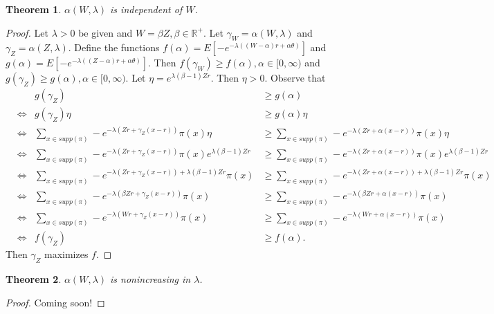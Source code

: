 \documentclass[12pt]{article}
\newtheorem{thm}{Theorem}[section]
\theoremstyle{definition}
\theoremstyle{remark}
\def\RR{\mathbb{R}}
\begin{document}
\begin{thm}
  $\alpha(W, \lambda)$ is independent of $W$.
\end{thm}
\begin{proof}
  Let $\lambda > 0$ be given and $W = \beta Z, \beta \in \RR^+$. Let $\gamma_W = \alpha(W, \lambda)$ and $\gamma_Z = \alpha(Z, \lambda)$. Define the functions $f(\alpha) = E \left[-e^{- \lambda ((W - \alpha)r + \alpha \theta)} \right]$ and $g(\alpha) = E \left[-e^{- \lambda ((Z - \alpha)r + \alpha \theta)} \right]$.
  Then $f(\gamma_W) \geq f(\alpha), \alpha \in [0, \infty )$ and $g(\gamma_Z) \geq g(\alpha), \alpha \in [0, \infty )$.
  Let $\eta = e^{\lambda (\beta - 1)Zr}$. Then $\eta > 0$. Observe that
  \begin{align*}
    &       & g(\gamma_Z) &\geq g(\alpha) \\
    & \iff  & g(\gamma_Z)\eta &\geq g(\alpha)\eta \\
    & \iff  & \sum_{x \in supp(\pi)} -e^{- \lambda (Zr + \gamma_Z (x - r))} \pi(x) \eta &\geq \sum_{x \in supp(\pi)} -e^{- \lambda (Zr + \alpha (x - r))} \pi(x) \eta \\
    & \iff  & \sum_{x \in supp(\pi)} -e^{- \lambda (Zr + \gamma_Z (x - r))}  \pi(x) e^{\lambda (\beta - 1)Zr} &\geq \sum_{x \in supp(\pi)} -e^{- \lambda (Zr + \alpha (x - r))} \pi(x) e^{\lambda (\beta - 1)Zr} \\
    & \iff  & \sum_{x \in supp(\pi)} -e^{- \lambda (Zr + \gamma_Z (x - r)) + \lambda (\beta - 1)Zr}  \pi(x) &\geq \sum_{x \in supp(\pi)} -e^{- \lambda (Zr + \alpha (x - r)) + \lambda (\beta - 1)Zr} \pi(x) \\
    & \iff  & \sum_{x \in supp(\pi)} -e^{- \lambda (\beta Zr + \gamma_Z (x - r))}  \pi(x) &\geq \sum_{x \in supp(\pi)} -e^{- \lambda (\beta Zr + \alpha (x - r))} \pi(x) \\
    & \iff  & \sum_{x \in supp(\pi)} -e^{- \lambda (Wr + \gamma_Z (x - r))}  \pi(x) &\geq \sum_{x \in supp(\pi)} -e^{- \lambda (Wr + \alpha (x - r))} \pi(x) \\
    & \iff  & f(\gamma_Z) &\geq f(\alpha).
  \end{align*}
  Then $\gamma_Z$ maximizes $f$.
\end{proof}
\begin{thm}
  $\alpha(W, \lambda)$ is nonincreasing in $\lambda$.
\end{thm}
\begin{proof}
Coming soon!
\end{proof}
%
%
\end{document}
